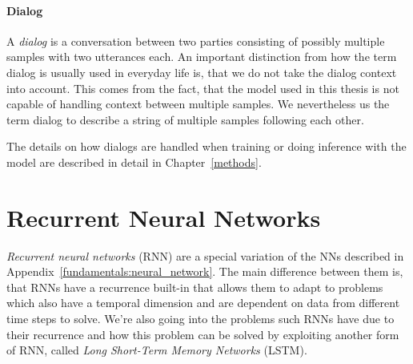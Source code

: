 \paragraph{Dialog} A \emph{dialog} is a conversation between two parties consisting of possibly multiple samples with two utterances each. An important distinction from how the term dialog is usually used in everyday life is, that we do not take the dialog context into account. This comes from the fact, that the model used in this thesis is not capable of handling context between multiple samples. We nevertheless us the term dialog to describe a string of multiple samples following each other.

The details on how dialogs are handled when training or doing inference with the model are described in detail in Chapter~\ref{methods}.

\section{Recurrent Neural Networks}
\emph{Recurrent neural networks} (RNN) are a special variation of the NNs described in Appendix~\ref{fundamentals:neural_network}. The main difference between them is, that RNNs have a recurrence built-in that allows them to adapt to problems which also have a temporal dimension and are dependent on data from different time steps to solve. We're also going into the problems such RNNs have due to their recurrence and how this problem can be solved by exploiting another form of RNN, called \emph{Long Short-Term Memory Networks} (LSTM).

